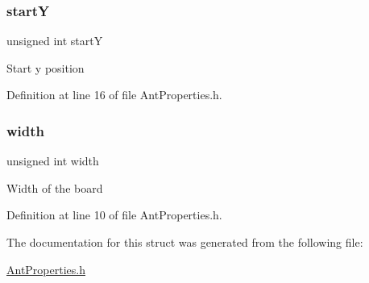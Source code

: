 \subsubsection{\texorpdfstring{startY}{startY}}
{\footnotesize\ttfamily unsigned int startY}

Start y position 

Definition at line 16 of file Ant\+Properties.\+h.

\mbox{\label{struct_ant_properties_aca34d28e3d8bcbcadb8edb4e3af24f8c}} 
\subsubsection{\texorpdfstring{width}{width}}
{\footnotesize\ttfamily unsigned int width}

Width of the board 

Definition at line 10 of file Ant\+Properties.\+h.



The documentation for this struct was generated from the following file\+:\begin{DoxyCompactItemize}
\item 
\mbox{\hyperlink{_ant_properties_8h}{Ant\+Properties.\+h}}\end{DoxyCompactItemize}
